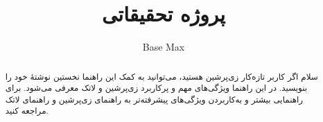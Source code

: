 \documentclass[10pt]{article}
\title{پروژه تحقیقاتی}
\author{Base Max\\ 
 	\small\lr{برنامه نویس و پژوهشگر}
 }
\begin{document}
	\maketitle
	
	\begin{abstract}
		سلام اگر کاربر تازه‌کار زی‌پرشین هستید، می‌توانید به کمک این راهنما نخستین نوشتهٔ خود را بنویسید. در این راهنما ویژگی‌های مهم و پرکاربرد زی‌پرشین و لاتک معرفی می‌شود. برای راهنمایی بیشتر و به‌کاربردن ویژگی‌های پیشرفته‌تر به راهنمای زی‌پرشین و راهنمای لاتک مراجعه کنید.
	\end{abstract}
	
	
\end{document}
